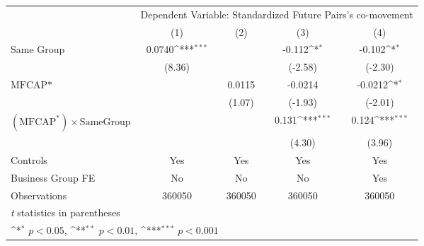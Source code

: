 {
\def\sym#1{\ifmmode^{#1}\else\(^{#1}\)\fi}
\begin{tabular}{l*{4}{c}}
\hline\hline
                &\multicolumn{4}{c}{Dependent Variable: Standardized Future Pairs's co-movement}\\\cmidrule(lr){2-5}
                &\multicolumn{1}{c}{(1)}         &\multicolumn{1}{c}{(2)}         &\multicolumn{1}{c}{(3)}         &\multicolumn{1}{c}{(4)}         \\
\hline
Same Group      &   0.0740\sym{***}&                  &   -0.112\sym{*}  &   -0.102\sym{*}  \\
                &   (8.36)         &                  &  (-2.58)         &  (-2.30)         \\
[1em]
$ \text{MFCAP*} $&                  &   0.0115         &  -0.0214         &  -0.0212\sym{*}  \\
                &                  &   (1.07)         &  (-1.93)         &  (-2.01)         \\
[1em]
 $ (\text{MFCAP}^*) \times {\text{SameGroup} }  $ &                  &                  &    0.131\sym{***}&    0.124\sym{***}\\
                &                  &                  &   (4.30)         &   (3.96)         \\
\hline
Controls        &      Yes         &      Yes         &      Yes         &      Yes         \\
Business Group FE&       No         &       No         &       No         &      Yes         \\
Observations    &   360050         &   360050         &   360050         &   360050         \\
\hline\hline
\multicolumn{5}{l}{\footnotesize \textit{t} statistics in parentheses}\\
\multicolumn{5}{l}{\footnotesize \sym{*} \(p<0.05\), \sym{**} \(p<0.01\), \sym{***} \(p<0.001\)}\\
\end{tabular}
}
